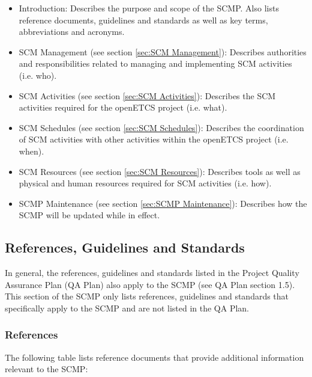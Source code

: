 \documentclass{template/openetcs_article}
\begin{document}
\vspace{-10pt}
\begin{itemize}
\item Introduction: Describes the purpose and scope of the SCMP. Also lists reference documents, guidelines and standards as well as key terms, abbreviations and acronyms.
\item SCM Management (see section \ref{sec:SCM Management}): Describes authorities and responsibilities related to managing and implementing SCM activities (i.e. who).
\item SCM Activities (see section \ref{sec:SCM Activities}): Describes the SCM activities required for the openETCS project (i.e. what).
\item SCM Schedules (see section \ref{sec:SCM Schedules}): Describes the coordination of SCM activities with other activities within the openETCS project (i.e. when).
\item SCM Resources (see section \ref{sec:SCM Resources}): Describes tools as well as physical and human resources required for SCM activities (i.e. how).
\item SCMP Maintenance (see section \ref{sec:SCMP Maintenance}): Describes how the SCMP will be updated while in effect.
\end{itemize}


\subsection{References, Guidelines and Standards} %
\label {sec:References, Guidelines and Standards}

In general, the references, guidelines and standards listed in the Project Quality Assurance Plan (QA Plan) also apply to the SCMP (see QA Plan section 1.5). This section of the SCMP only lists references, guidelines and standards that specifically apply to the SCMP and are not listed in the QA Plan. 


\subsubsection{References} %
\label{sec:References}

The following table lists reference documents that provide additional information relevant to the SCMP:
\end{document}
